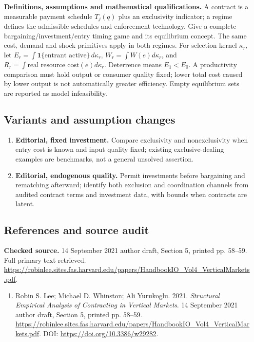 \documentclass[11pt,a4paper]{article}
\begin{document}
\textbf{Definitions, assumptions and mathematical qualifications.} A contract is a measurable payment schedule \(T_j(q)\) plus an exclusivity indicator; a regime defines the admissible schedules and enforcement technology. Give a complete bargaining/investment/entry timing game and its equilibrium concept. The same cost, demand and shock primitives apply in both regimes. For selection kernel \(\kappa_r\), let \(E_r=\int\mathbf1\{\text{entrant active}\}\,d\kappa_r\), \(W_r=\int W(e)d\kappa_r\), and \(R_r=\int\text{real resource cost}(e)d\kappa_r\). Deterrence means \(E_1<E_0\). A productivity comparison must hold output or consumer quality fixed; lower total cost caused by lower output is not automatically greater efficiency. Empty equilibrium sets are reported as model infeasibility.
\subsection*{Variants and assumption changes}
\begin{enumerate}
\item \textbf{Editorial, fixed investment.} Compare exclusivity and nonexclusivity when entry cost is known and input quality fixed; existing exclusive-dealing examples are benchmarks, not a general unsolved assertion.
\item \textbf{Editorial, endogenous quality.} Permit investments before bargaining and rematching afterward; identify both exclusion and coordination channels from audited contract terms and investment data, with bounds when contracts are latent.
\end{enumerate}
\subsection*{References and source audit}
\textbf{Checked source.} 14 September 2021 author draft, Section 5, printed pp. 58--59. Full primary text retrieved. \url{https://robinlee.sites.fas.harvard.edu/papers/HandbookIO_Vol4_VerticalMarkets.pdf}.
\begin{enumerate}\raggedright
\item\hypertarget{definitions:source:30007681:1}{} Robin S. Lee; Michael D. Whinston; Ali Yurukoglu. 2021. \emph{Structural Empirical Analysis of Contracting in Vertical Markets}. 14 September 2021 author draft, Section 5, printed pp. 58--59.
\url{https://robinlee.sites.fas.harvard.edu/papers/HandbookIO_Vol4_VerticalMarkets.pdf}.
DOI: \url{https://doi.org/10.3386/w29282}.
\end{enumerate}
\end{document}
